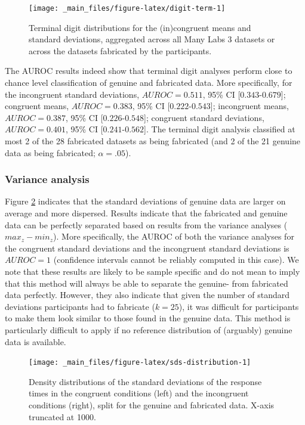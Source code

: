 \documentclass[a5paper]{book}
\begin{document}
\begin{figure}
\texttt{[image: \_main\_files/figure-latex/digit-term-1]} \caption{Terminal digit distributions for the (in)congruent means and standard deviations, aggregated across all Many Labs 3 datasets or across the datasets fabricated by the participants.}\label{fig:digit-term}
\end{figure}

The AUROC results indeed show that terminal digit analyses perform close
to chance level classification of genuine and fabricated data. More
specifically, for the incongruent standard deviations, \(AUROC=0.511\),
95\% CI {[}\(0.343\)-\(0.679\){]}; congruent means, \(AUROC=0.383\),
95\% CI {[}\(0.222\)-\(0.543\){]}; incongruent means, \(AUROC=0.387\),
95\% CI {[}\(0.226\)-\(0.548\){]}; congruent standard deviations,
\(AUROC=0.401\), 95\% CI {[}\(0.241\)-\(0.562\){]}. The terminal digit
analysis classified at most 2 of the 28 fabricated datasets as being
fabricated (and 2 of the 21 genuine data as being fabricated;
\(\alpha=.05\)).

\subsubsection{Variance analysis}\label{variance-analysis-2}

Figure \ref{fig:sds-distribution} indicates that the standard deviations
of genuine data are larger on average and more dispersed. Results
indicate that the fabricated and genuine data can be perfectly separated
based on results from the variance analyses (\(max_z-min_z\)). More
specifically, the AUROC of both the variance analyses for the congruent
standard deviations and the incongruent standard deviations is
\(AUROC=1\) (confidence intervals cannot be reliably computed in this
case). We note that these results are likely to be sample specific and
do not mean to imply that this method will always be able to separate
the genuine- from fabricated data perfectly. However, they also indicate
that given the number of standard deviations participants had to
fabricate (\(k=25\)), it was difficult for participants to make them
look similar to those found in the genuine data. This method is
particularly difficult to apply if no reference distribution of
(arguably) genuine data is available.

\begin{figure}
\texttt{[image: \_main\_files/figure-latex/sds-distribution-1]} \caption{Density distributions of the standard deviations of the response times in the congruent conditions (left) and the incongruent conditions (right), split for the genuine and fabricated data. X-axis truncated at 1000.}\label{fig:sds-distribution}
\end{figure}
\end{document}
